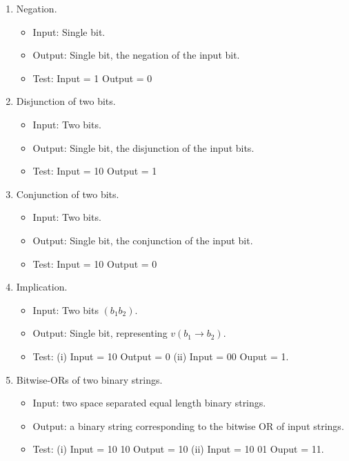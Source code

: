 \documentclass[11pt]{report}
\begin{document}
\begin{enumerate}
	
	\item Negation. 
		
		\begin{itemize}
			\item[] Input: Single bit. 
			\item[] Output: Single bit, the negation of the input bit.
			\item[] Test: Input = 1 Output = 0
		\end{itemize}

	\item Disjunction of two bits. 

		\begin{itemize}
			\item[] Input: Two bits. 
			\item[] Output: Single bit, the disjunction of the input bits. 
			\item[] Test: Input = 10 Output = 1
		\end{itemize}		

	\item Conjunction of two bits. 

		\begin{itemize}
			\item[] Input: Two bits. 
			\item[] Output: Single bit, the conjunction of the input bit. 
			\item[] Test: Input = 10 Output = 0
		\end{itemize}		
		
	\item Implication. 

		\begin{itemize}
			\item[] Input: Two bits $(b_{1}b_{2})$. 
			\item[] Output: Single bit, representing $v(b_{1}\to b_{2})$. 
			\item[] Test: (i) Input = 10 Output = 0 (ii) Input = 00 Ouput = 1.
		\end{itemize}

		
	\item Bitwise-ORs of two binary strings. 

		\begin{itemize}
			\item[] Input: two space separated equal length binary strings. 
			\item[] Output: a binary string corresponding to the bitwise OR of input strings.
			\item[] Test: (i) Input = 10 10 Output = 10 (ii) Input = 10 01 Ouput = 11.
		\end{itemize}
	

\end{enumerate}
\end{document}
